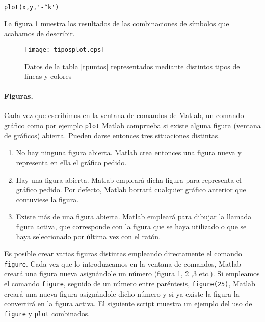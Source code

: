 \begin{verbatim}
plot(x,y,'-^k')
\end{verbatim}

La figura \ref{fig:tplot} muestra los resultados de las combinaciones de símbolos que acabamos de describir.

\begin{figure}[h]
\centering
\texttt{[image: tiposplot.eps]}
\caption{Datos de la tabla \ref{tpuntos} representados mediante distintos tipos de líneas y colores}
\label{fig:tplot}
\end{figure}

\paragraph{Figuras.} Cada vez que escribimos en la ventana de comandos de Matlab, un comando gráfico como por ejemplo \texttt{plot} Matlab comprueba si existe alguna figura (ventana de gráficos) abierta. Pueden darse entonces tres situaciones distintas. 

\begin{enumerate}
\item No hay ninguna figura abierta. Matlab crea entonces una figura nueva y representa en ella el gráfico pedido.
\item Hay una figura abierta. Matlab empleará dicha figura para representa el gráfico pedido. Por defecto, Matlab borrará cualquier gráfico anterior que contuviese la figura.
\item Existe más de una figura abierta. Matlab empleará para dibujar la llamada figura activa, que corresponde con la figura que se haya utilizado o que se haya seleccionado por última vez con el ratón.
\end{enumerate}

Es posible crear varias figuras distintas empleando directamente el comando \texttt{figure}. Cada vez que lo introduzcamos en la ventana de comandos, Matlab creará una figura nueva asignándole un número (figura 1, 2 ,3 etc.). Si empleamos el comando \texttt{figure}, seguido de un número entre paréntesis, \texttt{figure(25)}, Matlab creará una nueva figura asignándole dicho número y si ya existe la figura la convertirá en la figura activa.
El siguiente script muestra un ejemplo del uso de \texttt{figure} y \texttt{plot} combinados.


